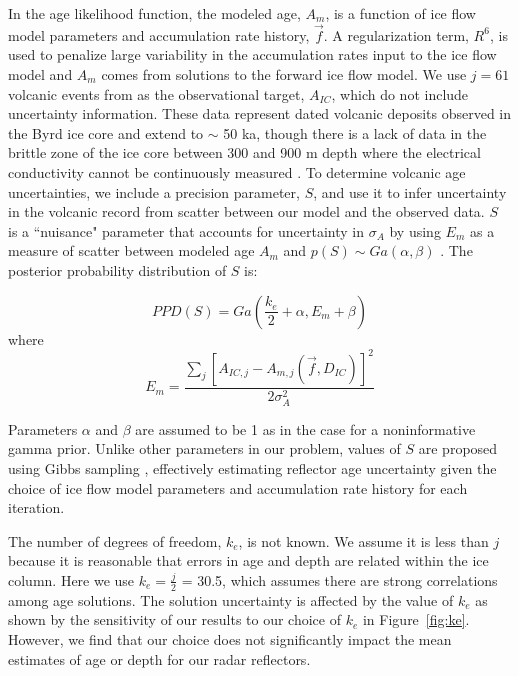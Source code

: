 In the age likelihood function, the modeled age, $A_m$, is a function of ice flow model parameters and accumulation rate history, $\vec{f}$. A regularization term, $R^6$, is used to penalize large variability in the accumulation rates input to the ice flow model and $A_m$ comes from solutions to the forward ice flow model. We use $j=61$ volcanic events from \citet{hammer1997} as the observational target, $A_{IC}$, which do not include uncertainty information. These data represent dated volcanic deposits observed in the Byrd ice core and extend to $\sim$ 50 ka, though there is a lack of data in the brittle zone of the ice core between 300 and 900 m depth where the electrical conductivity cannot be continuously measured \citep{hammer1997}. To determine volcanic age uncertainties, we include a precision parameter, $S$, and use it to infer uncertainty in the volcanic record from scatter between our model and the observed data. $S$ is a ``nuisance" parameter that accounts for uncertainty in $\sigma_A$ by using $E_m$ as a measure of scatter between modeled age $A_m$ and $p(S) \sim Ga(\alpha,\beta)$ \citep{jackson&huerta2016}. The posterior probability distribution of $S$ is:

\begin{equation}\label{eqn:S}
PPD(S) = Ga(\frac{k_e}{2}+\alpha, E_m+\beta)
\end{equation}
where 
\begin{equation}
 E_m= \frac{\sum_{j}[A_{IC,j} - A_{m,j}(\vec{f},D_{IC})]^2}{2\sigma_A^2} 
\end{equation}

Parameters $\alpha$ and $\beta$ are assumed to be 1 as in the case for a noninformative gamma prior. Unlike other parameters in our problem, values of $S$ are proposed using Gibbs sampling \citep{gelfand1992}, effectively estimating reflector age uncertainty given the choice of ice flow model parameters and accumulation rate history for each iteration.

The number of degrees of freedom, $k_e$, is not known. We assume it is less than $j$ because it is reasonable that errors in age and depth are related within the ice column. Here we use $k_e = \frac{j}{2}$ = 30.5, which assumes there are strong correlations among age solutions. The solution uncertainty is affected by the value of $k_e$ as shown by the sensitivity of our results to our choice of $k_e$ in Figure~\ref{fig:ke}. However, we find that our choice does not significantly impact the mean estimates of age or depth for our radar reflectors. %

